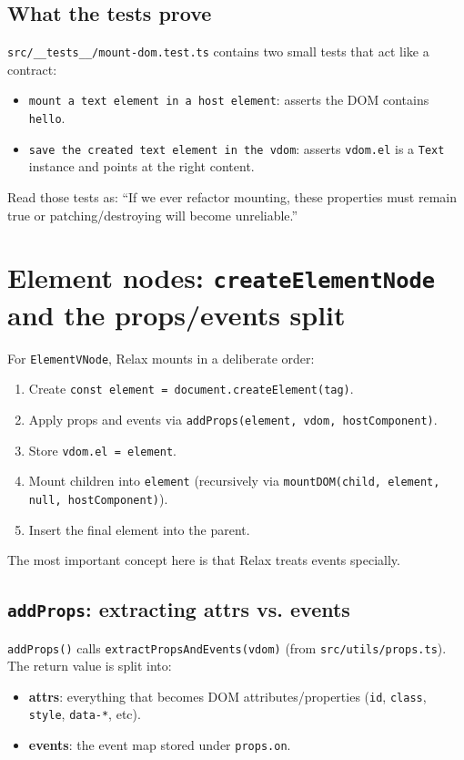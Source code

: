 \subsection*{What the tests prove}
  	\texttt{src/\_\_tests\_\_/mount-dom.test.ts} contains two small tests that act like a contract:

\begin{itemize}
  \item \texttt{mount a text element in a host element}: asserts the DOM contains \texttt{hello}.
  \item \texttt{save the created text element in the vdom}: asserts \texttt{vdom.el} is a \texttt{Text} instance and points at the right content.
\end{itemize}

Read those tests as: ``If we ever refactor mounting, these properties must remain true or patching/destroying will become unreliable.''

\section{Element nodes: \texttt{createElementNode} and the props/events split}
For \texttt{ElementVNode}, Relax mounts in a deliberate order:

\begin{enumerate}
  \item Create \texttt{const element = document.createElement(tag)}.
  \item Apply props and events via \texttt{addProps(element, vdom, hostComponent)}.
  \item Store \texttt{vdom.el = element}.
  \item Mount children into \texttt{element} (recursively via \texttt{mountDOM(child, element, null, hostComponent)}).
  \item Insert the final element into the parent.
\end{enumerate}

The most important concept here is that Relax treats events specially.

\subsection{\texttt{addProps}: extracting attrs vs. events}
  	\texttt{addProps()} calls \texttt{extractPropsAndEvents(vdom)} (from \texttt{src/utils/props.ts}). The return value is split into:

\begin{itemize}
  \item \textbf{attrs}: everything that becomes DOM attributes/properties (\texttt{id}, \texttt{class}, \texttt{style}, \texttt{data-*}, etc).
  \item \textbf{events}: the event map stored under \texttt{props.on}.
\end{itemize}

